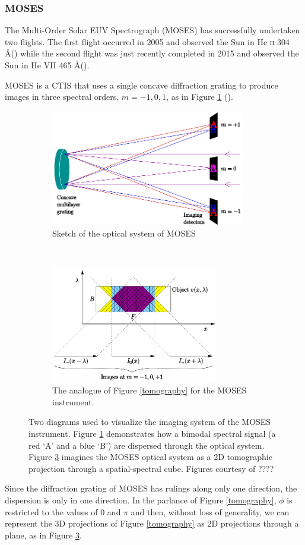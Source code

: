 \documentclass{article}
\begin{document}
			\subsubsection{MOSES}

				The Multi-Order Solar EUV Spectrograph (MOSES) has successfully undertaken two flights. The first flight occurred in 2005 and observed the Sun in He \textsc{ii} 304 \AA (\cite{fox1}) while the second flight was just recently completed in 2015 and observed the Sun in He VII 465 \AA (\cite{smart1}). 
				
				MOSES is a CTIS that uses a single concave diffraction grating to produce images in three spectral orders, $m=-1,0,1$, as in Figure \ref{optics} (\cite{kankel1}). 		
				\begin{figure}[h!]
					\centering
					\begin{subfigure}[t]{0.49\textwidth}
						\centering
						\includegraphics[height=2in]{figures/concave}
						\caption{Sketch of the optical system of MOSES}
						\label{optics}
					\end{subfigure}	
					~
					\begin{subfigure}[t]{0.49\textwidth}
						\centering
						\includegraphics[height=2in]{figures/moses_cube}
						\caption{The analogue of Figure \ref{tomography} for the MOSES instrument.}
						\label{moses_tomo}
					\end{subfigure}	
					\caption{Two diagrams used to visualize the imaging system of the MOSES instrument. Figure \ref{optics} demonstrates how a bimodal spectral signal (a red `A' and a blue `B') are dispersed through the optical system. Figure \ref{moses_tomo} imagines the MOSES optical system as a 2D tomographic projection through a spatial-spectral cube. Figures courtesy of \cite{fox1}????}
				\end{figure}
				Since the diffraction grating of MOSES has rulings along only one direction, the dispersion is only in one direction. In the parlance of Figure \ref{tomography}, $\phi$ is restricted to the values of 0 and $\pi$ and then, without loss of generality, we can represent the 3D projections of Figure \ref{tomography} as 2D projections through a plane, as in Figure \ref{moses_tomo}.
				
\end{document}

